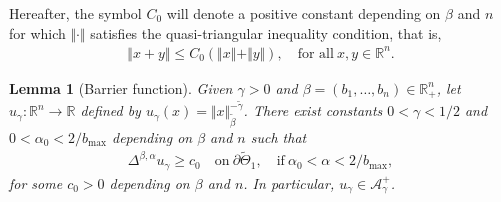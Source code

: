 \documentclass[10pt, leqno]{article}
\newtheorem{lemma}[theorem]{Lemma}
\theoremstyle{definition}
\theoremstyle{remark}
\numberwithin{equation}{section}
\begin{document}
Hereafter, the symbol $C_{0}$ will denote a positive constant depending on $\beta$ and $n$ for which $\Vert \cdot \Vert$ satisfies the quasi-triangular inequality condition, that is,
\begin{eqnarray}
\Vert x + y \Vert \leq C_{0}\left(\Vert x \Vert + \Vert y \Vert \right), \quad \text{for all} \ x,y \in \mathbb{R}^{n}.
\end{eqnarray}

\begin{lemma}[Barrier function]
\label{Bar. func.}
Given $\gamma >0$ and $\beta=\left(b_{1}, \dots, b_{n} \right) \in \mathbb{R}^{n}_{+}$, let $u_{\gamma}: \mathbb{R}^{n} \rightarrow \mathbb{R}$ defined by $u_{\gamma}(x) = \Vert x \Vert_{\tilde{\beta}}^{-\tilde{\gamma}}$. There exist constants $0 < \gamma < 1/2$ and $0 < \alpha_{0} < 2/b_{\max}$ depending on $\beta$ and $n$ such that
\begin{eqnarray}
\label{barrier function inequality}
\Delta^{\beta, \alpha} u_{\gamma} \geq c_{0} \quad \text{on} \ \partial \tilde{\Theta}_{1}, \quad \text{if} \ \alpha_{0} < \alpha < 2/b_{\max},
\end{eqnarray}
for some $c_{0} > 0$ depending on $\beta$ and $n$. In particular, $u_{\gamma} \in \mathcal{A}^{+}_{\gamma}$.
\end{lemma}
\end{document}
